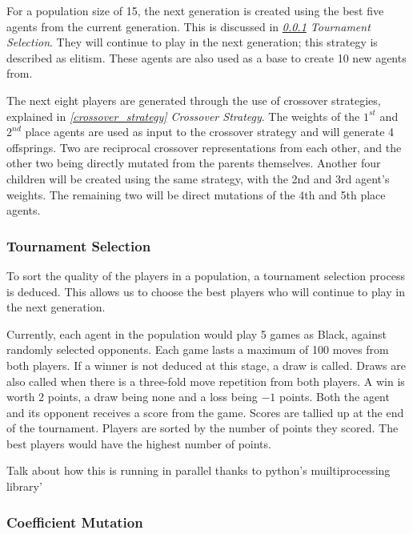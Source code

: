 \documentclass[12pt,a4paper]{article}
\begin{document}
            For a population size of 15, the next generation is created using the best five agents from the current generation. This is discussed in {\it{\ref{tournament_selection} Tournament Selection}}. 
            They will continue to play in the next generation; this strategy is described as elitism. These agents are also used as a base to create 10 new agents from. 
            
            The next eight players are generated through the use of crossover strategies, explained in {\it{\ref{crossover_strategy} Crossover Strategy}}. The weights of the $1^{st}$ and $2^{nd}$ place agents are used as input to the crossover strategy and will generate 4 offsprings. Two are reciprocal crossover representations from each other, and the other two being directly mutated from the parents themselves. Another four children will be created using the same strategy, with the 2nd and 3rd agent's weights. The remaining two will be direct mutations of the 4th and 5th place agents.

        \subsubsection{Tournament Selection} \label{tournament_selection}

            To sort the quality of the players in a population, a tournament selection process is deduced. This allows us to choose the best players who will continue to play in the next generation.

            Currently, each agent in the population would play 5 games as Black, against randomly selected opponents. Each game lasts a maximum of 100 moves from both players. If a winner is not deduced at this stage, a draw is called. Draws are also called when there is a three-fold move repetition from both players. A win is worth $2$ points, a draw being none and a loss being $-1$ points. Both the agent and its opponent receives a score from the game.
            Scores are tallied up at the end of the tournament. Players are sorted by the number of points they scored. The best players would have the highest number of points.
            
            Talk about how this is running in parallel thanks to python's muiltiprocessing library'
            
        \subsubsection{Coefficient Mutation} \label{coefficient_mutation}
\end{document}
